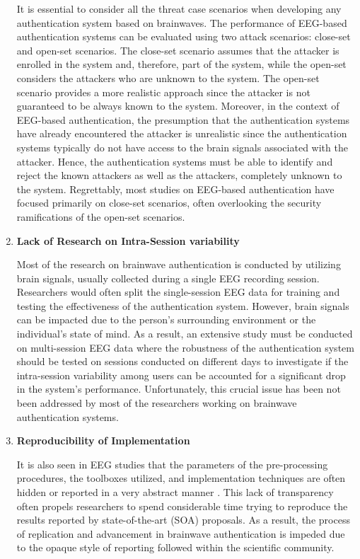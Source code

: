 \begin{enumerate}
It is essential to consider all the threat case scenarios when developing any authentication system based on brainwaves. The performance of EEG-based authentication systems can be evaluated using two attack scenarios: close-set and open-set scenarios. The close-set scenario assumes that the attacker is enrolled in the system and, therefore, part of the system, while the open-set considers the attackers who are unknown to the system. The open-set scenario provides a more realistic approach since the attacker is not guaranteed to be always known to the system. Moreover, in the context of EEG-based authentication, the presumption that the authentication systems have already encountered the attacker is unrealistic since the authentication systems typically do not have access to the brain signals associated with the attacker\cite{arias2023performance}. Hence, the authentication systems must be able to identify and reject the known attackers as well as the attackers, completely unknown to the system. %
Regrettably, most studies on EEG-based authentication have focused primarily on close-set scenarios, often overlooking the security ramifications of the open-set scenarios.

\item \textbf{\large Lack of Research on Intra-Session variability} 
\smallskip

Most of the research on brainwave authentication is conducted by utilizing brain signals, usually collected during a single EEG recording session. Researchers would often split the single-session EEG data for training and testing the effectiveness of the authentication system. However, brain signals can be impacted due to the person’s surrounding environment or the individual’s state of mind. As a result, an extensive study must be conducted on multi-session EEG data where the robustness of the authentication system should be tested on sessions conducted on different days to investigate if the intra-session variability among users can be accounted for a significant drop in the system’s performance. Unfortunately, this crucial issue has been not been addressed by most of the researchers working on brainwave authentication systems.

\item \textbf{\large Reproducibility of Implementation} 
\smallskip

It is also seen in EEG studies that the parameters of the pre-processing procedures, the toolboxes utilized, and implementation techniques are often hidden or reported in a very abstract manner \cite{moabb}. This lack of transparency often propels researchers to spend considerable time trying to reproduce the results reported by state-of-the-art (SOA) proposals. As a result, the process of replication and advancement in brainwave authentication is impeded due to the opaque style of reporting followed within the scientific community. 


\end{enumerate}
